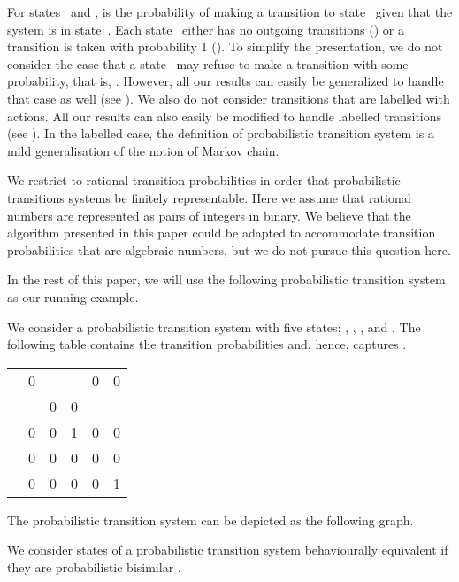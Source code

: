 \documentclass{LMCS}
\begin{document}
For states~ and ,  is the probability of making a
transition to state~ given that the system is in state~.
Each state~ either has no outgoing transitions ()
or a transition is taken with probability 1 ().
To simplify the presentation, we do not consider the case that a 
state~ may refuse to make a transition with some probability, 
that is, .  However, all our 
results can easily be generalized to handle that case as well
(see \cite{S06:york}).  We also do not consider transitions that are 
labelled with actions.  All our results can also easily be modified to 
handle labelled transitions (see \cite{S06:york}).  In the labelled case, 
the definition of probabilistic transition system is a mild generalisation 
of the notion of Markov chain.

We restrict to rational transition probabilities in order that
probabilistic transitions systems be finitely representable.  Here we
assume that rational numbers are represented as pairs of integers in
binary. We believe that the algorithm presented in this paper could be
adapted to accommodate transition probabilities that are algebraic
numbers, but we do not pursue this question here.

In the rest of this paper, we will use the following probabilistic
transition system as our running example.

\begin{exa}
\label{example:1}
We consider a probabilistic transition system with five states:
, , ,  and .  The following table contains
the transition probabilities and, hence, captures .
\begin{center}
\begin{tabular}{l|lllll}
      &  &  &  &  & \\
\hline
 & 0     &  &  & 0     & 0    \\
 &  & 0     & 0     &  &  \\
 & 0     & 0     & 1     & 0     & 0    \\
 & 0     & 0     & 0     & 0     & 0    \\
 & 0     & 0     & 0     & 0     & 1    
\end{tabular}
\end{center}
The probabilistic transition system can be depicted as the following
graph.

\end{exa}

We consider states of a probabilistic transition system behaviourally
equivalent if they are probabilistic bisimilar \cite{LS91:ic}.
\end{document}
